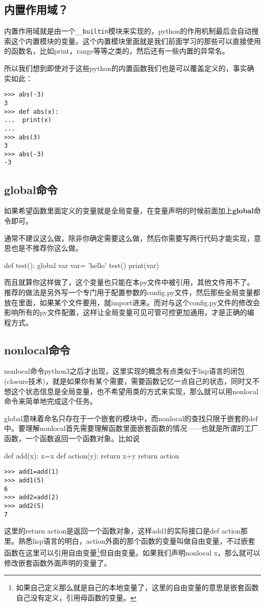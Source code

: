 \documentclass[12pt,oneside]{book}
\begin{document}
\begin{common-format}
\subsection{内置作用域？}
内置作用域就是由一个\verb+__builtin+模块来实现的，python的作用机制最后会自动搜索这个内置模块的变量。这个内置模块里面就是我们前面学习的那些可以直接使用的函数名，比如print，range等等之类的，然后还有一些内置的异常名。

所以我们想到即使对于这些python的内置函数我们也是可以覆盖定义的，事实确实如此：
\begin{Verbatim}
>>> abs(-3)
3
>>> def abs(x):
...  print(x)
... 
>>> abs(3)
3
>>> abs(-3)
-3
\end{Verbatim}


\subsection{global命令}
如果希望函数里面定义的变量就是全局变量，在变量声明的时候前面加上\textbf{global}命令即可。

通常不建议这么做，除非你确定需要这么做，然后你需要写两行代码才能实现，意思也是不推荐你这么做。
\begin{tcbpython}
def test():
    global var
    var= 'hello'
test()
print(var)
\end{tcbpython}

而且就算你这样做了，这个变量也只能在本py文件中被引用，其他文件用不了。推荐的做法是另外写一个专门用于配置参数的config.py文件，然后那些全局变量都放在里面，如果某个文件要用，就import进来。而对与这个config.py文件的修改会影响所有的py文件配置，这样让全局变量可见可管可控更加通用，才是正确的编程方式。


\subsection{nonlocal命令}
nonlocal命令python3之后才出现，这里实现的概念有点类似于lisp语言的闭包(closure技术)，就是如果你有某个需要，需要函数记忆一点自己的状态，同时又不想这个状态信息是全局变量，也不希望用类的方式来实现，那么就可以用nonlocal命令来简单地完成这个任务。

global意味着命名只存在于一个嵌套的模块中，而nonlocal的查找只限于嵌套的def中。要理解nonlocal首先需要理解函数里面嵌套函数的情况——也就是所谓的工厂函数，一个函数返回一个函数对象。比如说
\begin{tcbpython}
def add(x):
    x=x
    def action(y):
        return x+y
    return action
\end{tcbpython}
\begin{Verbatim}
>>> add1=add(1)
>>> add1(5)
6
>>> add2=add(2)
>>> add2(5)
7
\end{Verbatim}
这里的return action是返回一个函数对象，这样add1的实际接口是def action那里。熟悉lisp语言的明白，action外面的那个函数的变量叫做自由变量，不过嵌套函数在这里可以引用自由变量\footnote{如果自己定义那么就是自己的本地变量了，这里的自由变量的意思是嵌套函数自己没有定义，引用母函数的变量。}但自由变量。如果我们声明nonlocal x，那么就可以修改嵌套函数外面声明的变量了。


\end{common-format}
\end{document}
